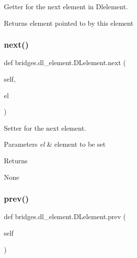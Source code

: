 Getter for the next element in Dlelement. 

\begin{DoxyReturn}{Returns}
element pointed to by this element 
\end{DoxyReturn}
\mbox{\label{classbridges_1_1dl__element_1_1_d_lelement_ae46f630cd7384689d4305770e6b2c7c1}} 
\subsubsection{\texorpdfstring{next()}{next()}\hspace{0.1cm}{\footnotesize\ttfamily [2/2]}}
{\footnotesize\ttfamily def bridges.\+dl\+\_\+element.\+D\+Lelement.\+next (\begin{DoxyParamCaption}\item[{}]{self,  }\item[{}]{el }\end{DoxyParamCaption})}



Setter for the next element. 


\begin{DoxyParams}{Parameters}
{\em el} & element to be set \\
\hline
\end{DoxyParams}
\begin{DoxyReturn}{Returns}


None 
\end{DoxyReturn}
\mbox{\label{classbridges_1_1dl__element_1_1_d_lelement_a66e7c4bfb2216a68744fe58c24e9917f}} 
\subsubsection{\texorpdfstring{prev()}{prev()}\hspace{0.1cm}{\footnotesize\ttfamily [1/2]}}
{\footnotesize\ttfamily def bridges.\+dl\+\_\+element.\+D\+Lelement.\+prev (\begin{DoxyParamCaption}\item[{}]{self }\end{DoxyParamCaption})}



